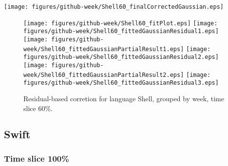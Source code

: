 \begin{center}
{\texttt{[image: figures/github-week/Shell60\_finalCorrectedGaussian.eps]}}
\end{center}

\FloatBarrier

\begin{figure}[t]
\centering
{}
{\texttt{[image: figures/github-week/Shell60\_fitPlot.eps]}}
{\texttt{[image: figures/github-week/Shell60\_fittedGaussianResidual1.eps]}}
{\texttt{[image: figures/github-week/Shell60\_fittedGaussianPartialResult1.eps]}}
{\texttt{[image: figures/github-week/Shell60\_fittedGaussianResidual2.eps]}}
{\texttt{[image: figures/github-week/Shell60\_fittedGaussianPartialResult2.eps]}}
{\texttt{[image: figures/github-week/Shell60\_fittedGaussianResidual3.eps]}}
\caption{Residual-based corretion for language Shell, grouped by week, time slice 60\%.}
\end{figure}


\FloatBarrier


\subsection{Swift}

\subsubsection{Time slice 100\%}

